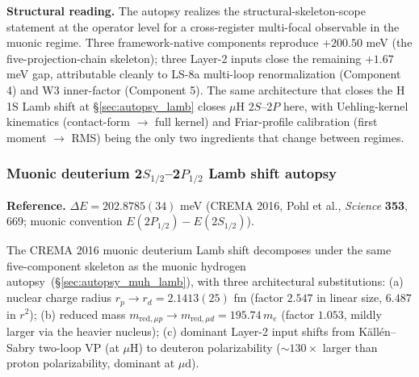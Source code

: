 \documentclass[11pt]{article}
\begin{document}
\textbf{Structural reading.}  The autopsy realizes the
structural-skeleton-scope statement at the operator level for a
cross-register multi-focal observable in the muonic regime.  Three
framework-native components reproduce $+200.50$ meV (the
five-projection-chain skeleton); three Layer-2 inputs close the
remaining $+1.67$ meV gap, attributable cleanly to LS-8a multi-loop
renormalization (Component 4) and W3 inner-factor (Component 5).
The same architecture that closes the H 1S Lamb shift at
\S\ref{sec:autopsy_lamb} closes $\mu$H 2$S$--2$P$ here, with
Uehling-kernel kinematics (contact-form $\to$ full kernel) and
Friar-profile calibration (first moment $\to$ RMS) being the only
two ingredients that change between regimes.

\subsubsection{Muonic deuterium 2$S_{1/2}$--2$P_{1/2}$ Lamb shift autopsy}
\label{sec:autopsy_mud_lamb}

\textbf{Reference.}  $\Delta E = 202.8785(34)$ meV (CREMA 2016, Pohl
et al., \emph{Science} \textbf{353}, 669; muonic convention
$E(2P_{1/2})-E(2S_{1/2})$).

The CREMA 2016 muonic deuterium Lamb shift decomposes under the
same five-component skeleton as the muonic hydrogen
autopsy~(\S\ref{sec:autopsy_muh_lamb}), with three architectural
substitutions: (a) nuclear charge radius $r_p \to r_d = 2.1413(25)$
fm (factor $2.547$ in linear size, $6.487$ in $r^2$); (b) reduced
mass $m_{\text{red},\mu p} \to m_{\text{red},\mu d} = 195.74\,m_e$
(factor $1.053$, mildly larger via the heavier nucleus); (c)
dominant Layer-2 input shifts from K\"all\'en--Sabry two-loop VP
(at $\mu$H) to deuteron polarizability ($\sim 130\times$ larger
than proton polarizability, dominant at $\mu$d).
\end{document}

